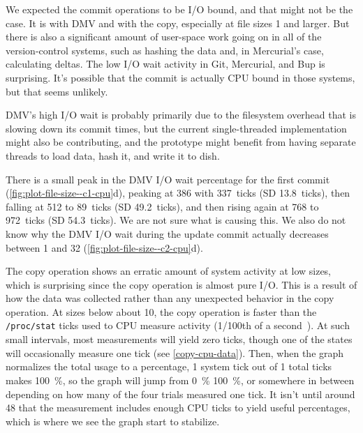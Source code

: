 We expected the commit operations to be I/O bound, and that might not be the
case. It is with DMV and with the copy, especially at file sizes \SI{1}{\gib}
and larger. But there is also a significant amount of user-space work going on
in all of the version-control systems, such as hashing the data and, in
Mercurial's case, calculating deltas. The low I/O wait activity in Git,
Mercurial, and Bup is surprising. It's possible that the commit is actually CPU
bound in those systems, but that seems unlikely.

DMV's high I/O wait is probably primarily due to the filesystem overhead that is
slowing down its commit times, but the current single-threaded implementation
might also be contributing, and the prototype might benefit from having separate
threads to load data, hash it, and write it to dish.

There is a small peak in the DMV I/O wait percentage for the first commit
(\autoref{fig:plot-file-size--c1-cpu}d), peaking at \SI{386}{\mib} with
\SI{337}{ticks} (SD \SI{13.8}{ticks}), then falling at \SI{512}{\mib} to
\SI{89}{ticks} (SD \SI{49.2}{ticks}), and then rising again at \SI{768}{\mib} to
\SI{972}{ticks} (SD \SI{54.3}{ticks}). We are not sure what is causing this. We
also do not know why the DMV I/O wait during the update commit actually
decreases between \SI{1}{\gib} and \SI{32}{\gib}
(\autoref{fig:plot-file-size--c2-cpu}d).


The copy operation shows an erratic amount of system activity at low sizes,
which is surprising since the copy operation is almost pure I/O. This is a
result of how the data was collected rather than any unexpected behavior in the
copy operation. At sizes below about \SI{10}{\mib}, the copy operation is faster
than the \lstinline{/proc/stat} ticks used to CPU measure activity
(\num{1/100}{th} of a second~\cite{proc_man_page}). At such small intervals, most
measurements will yield zero ticks, though one of the states will occasionally
measure one tick (see \autoref{copy-cpu-data}). Then, when the graph normalizes
the total usage to a percentage, \num{1} system tick out of \num{1} total ticks
makes \SI{100}{\percent}, so the graph will jump from \SI{0}{\percent}
\SI{100}{\percent}, or somewhere in between depending on how many of the four
trials measured one tick. It isn't until around \SI{48}{\mib} that the
measurement includes enough CPU ticks to yield useful percentages, which is
where we see the graph start to stabilize.


